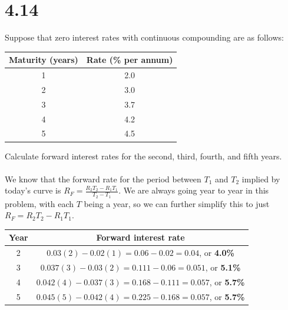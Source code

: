 \documentclass{article}
\begin{document}
{\Large 

\section*{4.14}

Suppose that zero interest rates with continuous compounding are as follows:
\begin{center}
\begin{tabular}{ |c|c| } 
 \hline
 Maturity (years) & Rate (\% per annum) \\ 
 \hline
 1 & 2.0 \\ 
 \hline
 2 & 3.0 \\ 
 \hline
 3 & 3.7 \\ 
 \hline
 4 & 4.2 \\ 
 \hline
 5 & 4.5 \\ 
 \hline
\end{tabular}
\end{center}
Calculate forward interest rates for the second, third, fourth, and fifth years. \\ \\
We know that the forward rate for the period between \(T_1\) and \(T_2\) implied by today's curve is \(R_F = \frac{R_2 T_2 - R_1 T_1}{T_2 - T_1}\). We are always going year to year in this problem, with each \(T\) being a year, so we can further simplify this to just \(R_F = R_2T_2 - R_1T_1\).

\begin{center}
\begin{tabular}{ |c|c| } 
 \hline
 Year & Forward interest rate \\ 
 \hline
 2 & \(0.03(2) - 0.02(1) = 0.06 - 0.02 = 0.04\), or \textbf{4.0\%} \\ 
 \hline
 3 & \(0.037(3) - 0.03(2) = 0.111 - 0.06 = 0.051\), or \textbf{5.1\%} \\ 
 \hline
 4 & \(0.042(4) - 0.037(3) = 0.168 - 0.111 = 0.057\), or \textbf{5.7\%} \\ 
 \hline
 5 & \(0.045(5) - 0.042(4) = 0.225 - 0.168 = 0.057\), or \textbf{5.7\%} \\ 
 \hline
\end{tabular}
\end{center}

}
\end{document}
